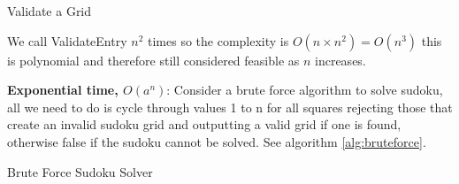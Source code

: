 \documentclass[a4paper,11pt]{report}
\begin{document}
\begin{algorithm}
\caption{Validate a Grid}\label{alg:valid}
\begin{algorithmic}
	 
			\EndIf
		\EndFor
	\EndFor
\EndProcedure
\end{algorithmic}
\end{algorithm}

We call ValidateEntry $n^2$ times so the complexity is $O(n\times n^2) = O(n^3)$ this is polynomial and therefore still considered feasible as $n$ increases. 
 
\textbf{Exponential time, $O(a^n)$}: Consider a brute force algorithm to solve sudoku, all we need to do is cycle through values 1 to n for all squares rejecting those that create an invalid sudoku grid and outputting a valid grid if one is found, otherwise false if the sudoku cannot be solved. See algorithm \ref{alg:bruteforce}.

\begin{algorithm}
\caption{Brute Force Sudoku Solver} \label{alg:bruteforce}
\begin{algorithmic}
		\Else
		\EndIf
	\EndIf
		\EndIf
	\EndFor
\EndProcedure
\end{algorithmic}
\end{algorithm}
\end{document}
